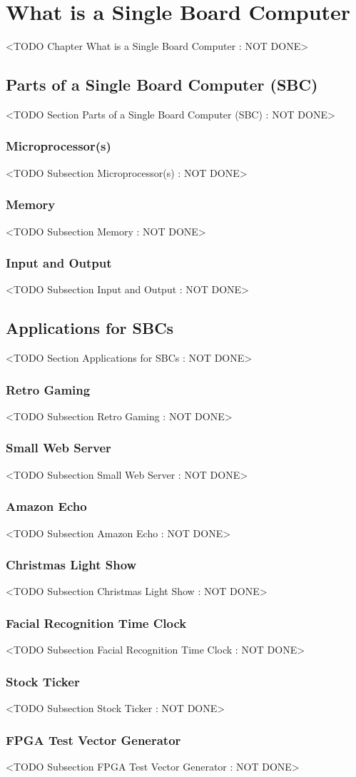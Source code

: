 \chapter{What is a Single Board Computer}
	<TODO Chapter What is a Single Board Computer : NOT DONE>

\section{Parts of a Single Board Computer (SBC)}
	<TODO Section Parts of a Single Board Computer (SBC) : NOT DONE>

\subsection{Microprocessor(s)}
	<TODO Subsection Microprocessor(s) : NOT DONE>

\subsection{Memory}
	<TODO Subsection Memory : NOT DONE>

\subsection{Input and Output}
	<TODO Subsection Input and Output : NOT DONE>

\section{Applications for SBCs}
	<TODO Section Applications for SBCs : NOT DONE>

\subsection{Retro Gaming}
	<TODO Subsection Retro Gaming : NOT DONE>

\subsection{Small Web Server}
	<TODO Subsection Small Web Server : NOT DONE>

\subsection{Amazon Echo}
	<TODO Subsection Amazon Echo : NOT DONE>

\subsection{Christmas Light Show}
	<TODO Subsection Christmas Light Show : NOT DONE>

\subsection{Facial Recognition Time Clock}
	<TODO Subsection Facial Recognition Time Clock : NOT DONE>

\subsection{Stock Ticker}
	<TODO Subsection Stock Ticker : NOT DONE>

\subsection{FPGA Test Vector Generator}
	<TODO Subsection FPGA Test Vector Generator : NOT DONE>

